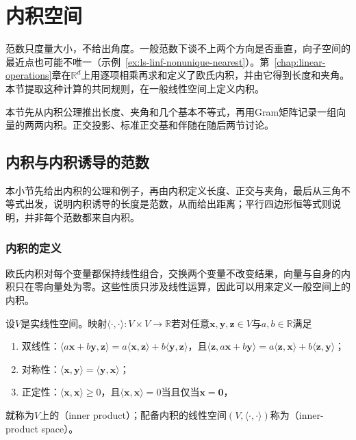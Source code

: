 
\section{内积空间}
\label{sec:ls-inner-product-spaces}

范数只度量大小，不给出角度。一般范数下谈不上两个方向是否垂直，向子空间的最近点也可能不唯一（示例~\ref{ex:ls-linf-nonunique-nearest}）。第~\ref{chap:linear-operations}章在$\mathbb R^d$上用逐项相乘再求和定义了欧氏内积，并由它得到长度和夹角。本节提取这种计算的共同规则，在一般线性空间上定义内积。

本节先从内积公理推出长度、夹角和几个基本不等式，再用Gram矩阵记录一组向量的两两内积。正交投影、标准正交基和伴随在随后两节讨论。

\subsection{内积与内积诱导的范数}
\label{sec:ls-inner-product-definition}

本小节先给出内积的公理和例子，再由内积定义长度、正交与夹角，最后从三角不等式出发，说明内积诱导的长度是范数，从而给出距离；平行四边形恒等式则说明，并非每个范数都来自内积。

\subsubsection{内积的定义}
\label{sec:ls-inner-product-axioms}

欧氏内积对每个变量都保持线性组合，交换两个变量不改变结果，向量与自身的内积只在零向量处为零。这些性质只涉及线性运算，因此可以用来定义一般空间上的内积。
\begin{definition}[内积空间]
\label{def:functional-inner-product-space}
\label{def:linear-algebra-inner-product}
设$V$是实线性空间。映射$\langle\cdot,\cdot\rangle:V\times V\to\mathbb R$若对任意$\bm x,\bm y,\bm z\in V$与$a,b\in\mathbb R$满足
\begin{enumerate}
 \item 双线性：$\langle a\bm x+b\bm y,\bm z\rangle=a\langle\bm x,\bm z\rangle+b\langle\bm y,\bm z\rangle$，且$\langle\bm z,a\bm x+b\bm y\rangle=a\langle\bm z,\bm x\rangle+b\langle\bm z,\bm y\rangle$；
 \item 对称性：$\langle\bm x,\bm y\rangle=\langle\bm y,\bm x\rangle$；
 \item 正定性：$\langle\bm x,\bm x\rangle\geq0$，且$\langle\bm x,\bm x\rangle=0$当且仅当$\bm x=\bm0$，
\end{enumerate}
就称为$V$上的（inner product）；配备内积的线性空间$(V,\langle\cdot,\cdot\rangle)$称为（inner-product space）。
\end{definition}

